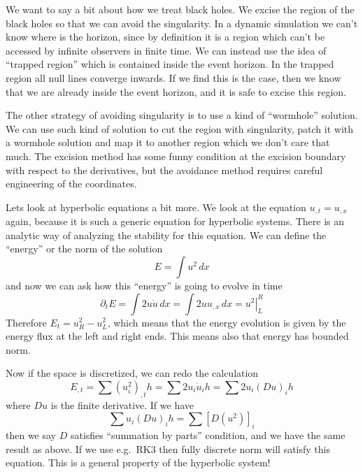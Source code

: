 \documentclass[letterpaper, 11pt]{article}
\numberwithin{equation}{section}
\numberwithin{figure}{section}
\begin{document}
We want to say a bit about how we treat black holes. We excise the region of the
black holes so that we can avoid the singularity. In a dynamic simulation we
can't know where is the horizon, since by definition it is a region which can't
be accessed by infinite observers in finite time. We can instead use the idea of
``trapped region'' which is contained inside the event horizon. In the trapped
region all null lines converge inwards. If we find this is the case, then we know
that we are already inside the event horizon, and it is safe to excise this
region.

The other strategy of avoiding singularity is to use a kind of ``wormhole''
solution. We can use such kind of solution to cut the region with singularity,
patch it with a wormhole solution and map it to another region which we don't
care that much. The excision method has some funny condition at the excision
boundary with respect to the derivatives, but the avoidance method requires
careful engineering of the coordinates.

Lets look at hyperbolic equations a bit more. We look at the equation
$u_{,t}=u_{,x}$ again, because it is such a generic equation for hyperbolic
systems. There is an analytic way of analyzing the stability for this equation.
We can define the ``energy'' or the norm of the solution
\begin{equation}
  \label{eq:35}
  E = \int u^2\,dx
\end{equation}
and now we can ask how this ``energy'' is going to evolve in time
\begin{equation}
  \label{eq:36}
  \partial_tE = \int 2u\dot{u}\,dx = \int 2uu_{,x}\,dx = \left. u^2\right|_{L}^{R}
\end{equation}
Therefore $E_{t} = u^2_{R} - u^{2}_{L}$, which means that the energy evolution
is given by the energy flux at the left and right ends. This means also that
energy has bounded norm.

Now if the space is discretized, we can redo the calculation
\begin{equation}
  \label{eq:37}
  E_{,t} = \sum (u_i^2)_{,t}h = \sum 2u_i\dot{u}_ih = \sum 2u_{i}(Du)_ih
\end{equation}
where $Du$ is the finite derivative. If we have
\begin{equation}
  \label{eq:38}
  \sum u_i(Du)_ih = \sum \left[ D(u^2) \right]_{i}
\end{equation}
then we say $D$ satisfies ``summation by parts'' condition, and we have the same
result as above. If we use e.g.\, RK3 then fully discrete norm will satisfy this
equation. This is a general property of the hyperbolic system!
\end{document}
